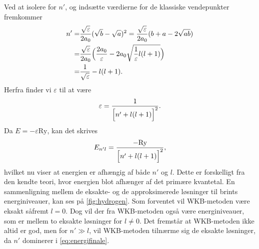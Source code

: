 %
Ved at isolere for $n'$, og indsætte værdierne for de klassiske vendepunkter fremkommer
\begin{align}
  n' = & \frac{\sqrt{\varepsilon}}{2a_0}(\sqrt{b}-\sqrt{a})^2 = \frac{\sqrt{\varepsilon}}{2a_0}(b+a-2\sqrt{ab})\\
     = & \frac{\sqrt{\varepsilon}}{2a_0}\Bigl(\frac{2a_0}{\varepsilon}-2a_0\sqrt{\frac{1}{\varepsilon}l(l+1)}\Bigr)\\
     = & \frac{1}{\sqrt{\varepsilon}} -l(l+1).
\end{align}
Herfra finder vi $\varepsilon$ til at være
\begin{equation}
    \varepsilon = \frac{1}{\Bigl[n'+l(l+1)  \Bigr]^2}.
\end{equation}
Da $E = -\varepsilon \mathrm{Ry}$, kan det skrives
\begin{equation}
    E_{n'l} = \frac{-\mathrm{Ry}}{\Bigl[n'+l(l+1)  \Bigr]^2},
    \label{eq:energifinale}
\end{equation}
hvilket nu viser at energien er afhængig af både $n'$ og $l$. Dette er forskelligt fra den kendte teori, hvor energien blot afhænger af det primære kvantetal. En sammenligning mellem de eksakte- og de approksimerede løsninger til brints energiniveauer, kan ses på \cref{fig:hydrogen}. Som forventet vil WKB-metoden være eksakt såfremt $l=0$. Dog vil der fra WKB-metoden også være energiniveauer, som er mellem to eksakte løsninger for $l\neq 0$. Det fremstår at WKB-metoden ikke altid er god, men for $n'\gg l$, vil WKB-metoden tilnærme sig de eksakte løsninger, da $n'$ dominerer i \cref{eq:energifinale}.


